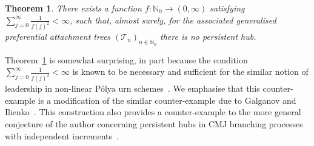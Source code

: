 \documentclass[12pt]{article}
\newtheorem{thm}{Theorem}[section]
\theoremstyle{definition}
\begin{document}
\begin{thm} \label{thm:counter-example}
    There exists a function $f\colon \mathbb{N}_0 \rightarrow (0,\infty)$ satisfying $\sum_{j=0}^{\infty} \frac{1}{f(j)^2} < \infty$, such that, almost surely, for the associated generalised preferential attachment trees $(\mathcal{T}_{n})_{n \in \mathbb{N}_0}$ there is no persistent hub. 
\end{thm}

Theorem~\ref{thm:counter-example} is somewhat surprising, in part because the condition $\sum_{j=0}^{\infty} \frac{1}{f(j)^2} < \infty$ is known to be necessary and sufficient for the similar notion of leadership in non-linear P\'olya urn schemes~\cite{oliveira-brownian-motion, leadership}. 
We emphasise that this counter-example is a modification of the similar counter-example due to Galganov and Ilienko~\cite{galganov-ilienko}. This construction also provides a counter-example to the more general conjecture of the author concerning persistent hubs in CMJ branching processes with independent increments~\cite[Remark~2.6]{iyer2024persistenthubscmjbranching}. 
\end{document}
